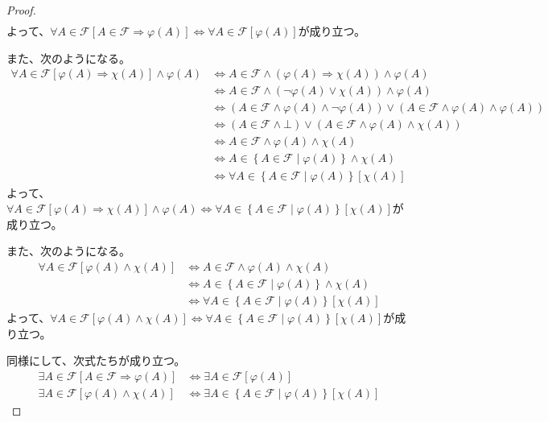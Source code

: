 \documentclass[a4paper]{jsarticle}
\begin{document}
\begin{proof}
\begin{align*}
\end{align*}
よって、$\forall A\in \mathcal{F}\left[ A\in \mathcal{F \Rightarrow}\varphi(A) \right] \Leftrightarrow \forall A\in \mathcal{F}\left[ \varphi(A) \right]$が成り立つ。\par
また、次のようになる。
\begin{align*}
\forall A\in \mathcal{F}\left[ \varphi(A) \Rightarrow \chi(A) \right] \land \varphi(A) &\Leftrightarrow A\in \mathcal{F \land}\left( \varphi(A) \Rightarrow \chi(A) \right) \land \varphi(A) \\
&\Leftrightarrow A\in \mathcal{F \land}\left( \neg\varphi(A) \vee \chi(A) \right) \land \varphi(A) \\
&\Leftrightarrow \left( A\in \mathcal{F \land}\varphi(A) \land \neg\varphi(A) \right) \vee \left( A\in \mathcal{F \land}\varphi(A) \land \varphi(A) \right) \\
&\Leftrightarrow \left( A\in \mathcal{F \land \bot} \right) \vee \left( A\in \mathcal{F \land}\varphi(A) \land \chi(A) \right) \\
&\Leftrightarrow A\in \mathcal{F \land}\varphi(A) \land \chi(A) \\
&\Leftrightarrow A \in \left\{ A\in \mathcal{F} \middle| \varphi(A) \right\} \land \chi(A) \\
&\Leftrightarrow \forall A \in \left\{ A\in \mathcal{F} \middle| \varphi(A) \right\}\left[ \chi(A) \right]
\end{align*}
よって、$\forall A \in \mathcal{F}\left[ \varphi(A) \Rightarrow \chi(A) \right] \land \varphi(A) \Leftrightarrow \forall A \in \left\{ A\in \mathcal{F} \middle| \varphi(A) \right\}\left[ \chi(A) \right]$が成り立つ。\par
また、次のようになる。
\begin{align*}
\forall A\in \mathcal{F}\left[ \varphi(A) \land \chi(A) \right] &\Leftrightarrow A\in \mathcal{F \land}\varphi(A) \land \chi(A) \\
&\Leftrightarrow A \in \left\{ A\in \mathcal{F} \middle| \varphi(A) \right\} \land \chi(A) \\
&\Leftrightarrow \forall A \in \left\{ A\in \mathcal{F} \middle| \varphi(A) \right\}\left[ \chi(A) \right]
\end{align*}
よって、$\forall A\in \mathcal{F}\left[ \varphi(A) \land \chi(A) \right] \Leftrightarrow \forall A \in \left\{ A\in \mathcal{F} \middle| \varphi(A) \right\}\left[ \chi(A) \right]$が成り立つ。\par
同様にして、次式たちが成り立つ。
\begin{align*}
\exists A\in \mathcal{F}\left[ A\in \mathcal{F \Rightarrow}\varphi(A) \right] &\Leftrightarrow \exists A\in \mathcal{F}\left[ \varphi(A) \right] \\
\exists A\in \mathcal{F}\left[ \varphi(A) \land \chi(A) \right] &\Leftrightarrow \exists A \in \left\{ A\in \mathcal{F} \middle| \varphi(A) \right\}\left[ \chi(A) \right]
\end{align*}
\end{proof}
\end{document}
